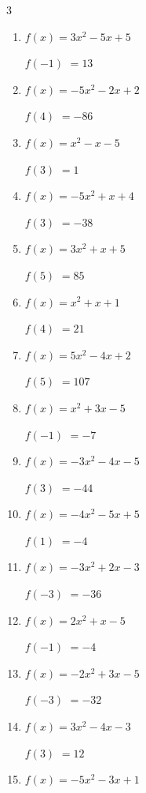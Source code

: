 \begin{multicols}{3}
\begin{enumerate}
$f(5)$
        $= -60$

\columnbreak %

  \item $f(x)=3x^{2}-5x+5$

$f(-1)$
        $= 13$

  \item $f(x)=-5x^{2}-2x+2$

$f(4)$
        $= -86$

  \item $f(x)=x^{2}-x-5$

$f(3)$
        $= 1$

  \item $f(x)=-5x^{2}+x+4$

$f(3)$
        $= -38$

  \item $f(x)=3x^{2}+x+5$

$f(5)$
        $= 85$

  \item $f(x)=x^{2}+x+1$

$f(4)$
        $= 21$

  \item $f(x)=5x^{2}-4x+2$

$f(5)$
        $= 107$

  \item $f(x)=x^{2}+3x-5$

$f(-1)$
        $= -7$

  \item $f(x)=-3x^{2}-4x-5$

$f(3)$
        $= -44$

  \item $f(x)=-4x^{2}-5x+5$

$f(1)$
        $= -4$

  \item $f(x)=-3x^{2}+2x-3$

$f(-3)$
        $= -36$

  \item $f(x)=2x^{2}+x-5$

$f(-1)$
        $= -4$

  \item $f(x)=-2x^{2}+3x-5$

$f(-3)$
        $= -32$

  \item $f(x)=3x^{2}-4x-3$

$f(3)$
        $= 12$

  \item $f(x)=-5x^{2}-3x+1$


\end{enumerate}
\end{multicols}
